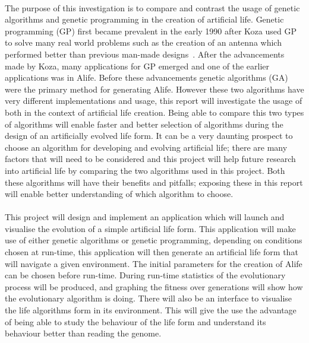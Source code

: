 \documentclass[12pt]{article}
\begin{document}
\paragraph{}
The purpose of this investigation is to compare and contrast the usage of genetic algorithms and genetic programming in the creation of artificial life.
Genetic programming (GP) first became prevalent in the early 1990 after Koza used GP to solve many real world problems such as the creation of an antenna
which performed better than previous man-made designs~\cite{koza05}. After the advancements made by Koza, many
applications for GP emerged and one of the earlier applications was in Alife. Before these advancements genetic algorithms (GA) were the primary method for generating Alife.
However these two algorithms have very different implementations and usage, this report will investigate the usage of both in the context of artificial life creation. 
Being able to compare this two types of algorithms will enable faster and better selection of algorithms during 
the design of an artificially evolved life form. It can be a very daunting prospect to choose an algorithm
for developing and evolving artificial life; there are many factors that will need to be considered and this
project will help future research into artificial life by comparing the two algorithms used in this project.
Both these algorithms will have their benefits and pitfalls; exposing these in this report will enable better understanding of which algorithm to choose.


\paragraph{}
This project will design and implement an application which will launch and visualise the evolution of a
simple artificial life form. This application will make use of either genetic algorithms or genetic programming,
depending on conditions chosen at run-time, this application will then generate an artificial life form that will navigate a given environment.
The initial parameters for the creation of Alife can be chosen before run-time. During run-time statistics of the evolutionary process will be produced, and
graphing the fitness over generations will show how the evolutionary algorithm is doing. There will also be an interface to visualise the life  algorithms form in its
environment. This will give the use the advantage of being able to study the behaviour of the life form and understand its behaviour better
than reading the genome.
\end{document}
